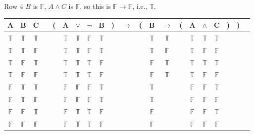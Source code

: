 \documentclass[
  ignorenonframetext,
]{beamer}
\renewcommand{\,}{\text{, }}
\def\True{\mathbb{T}}
\def\False{\mathbb{F}}
\begin{document}
\begin{frame}{Row 4}
\protect\hypertarget{row-4}{}
\(B\) is \(\False\), \(A \wedge C\) is \(\False\), so this is
\(\False \rightarrow \False\), i.e., \(\True\).

\begin{center}

\begin{tabular}{@{ }c@{ }@{ }c@{ }@{ }c | c@{ }@{}c@{}@{ }c@{ }@{ }c@{ }@{ }c@{ }@{ }c@{ }@{}c@{}@{ }c@{ }@{}c@{}@{ }c@{ }@{ }c@{ }@{}c@{}@{ }c@{ }@{ }c@{ }@{ }c@{ }@{}c@{}@{}c@{}@{ }c}
A & B & C &  & ( & A & $\vee$ & $\neg$ & B & ) & $\rightarrow$ & ( & B & $\rightarrow$ & ( & A & $\wedge$ & C & ) & ) & \\
\hline 
 $\True$ & $\True$ & $\True$ &  &  & $\True$ & $\True$ & $\False$ & $\True$ &  &&  & $\True$ & $\True$ &  & $\True$ & $\True$ & $\True$ &  &  & \\
 $\True$ & $\True$ & $\False$ &  &  & $\True$ & $\True$ & $\False$ & $\True$ &  &&  & $\True$ & $\False$ &  & $\True$ & $\False$ & $\False$ &  &  & \\
 $\True$ & $\False$ & $\True$ &  &  & $\True$ & $\True$ & $\True$ & $\False$ &  &&  & $\False$ & $\True$ &  & $\True$ & $\True$ & $\True$ &  &  & \\
 $\True$ & $\False$ & $\False$ &  &  & $\True$ & $\True$ & $\True$ & $\False$ &  &&  & $\False$ & $\True$ &  & $\True$ & $\False$ & $\False$ &  &  & \\
 $\False$ & $\True$ & $\True$ &  &  & $\False$ & $\False$ & $\False$ & $\True$ &  &&  & $\True$ &&  & $\False$ & $\False$ & $\True$ &  &  & \\
 $\False$ & $\True$ & $\False$ &  &  & $\False$ & $\False$ & $\False$ & $\True$ &  &&  & $\True$ &&  & $\False$ & $\False$ & $\False$ &  &  & \\
 $\False$ & $\False$ & $\True$ &  &  & $\False$ & $\True$ & $\True$ & $\False$ &  &&  & $\False$ &&  & $\False$ & $\False$ & $\True$ &  &  & \\
 $\False$ & $\False$ & $\False$ &  &  & $\False$ & $\True$ & $\True$ & $\False$ &  &&  & $\False$ &&  & $\False$ & $\False$ & $\False$ &  &  & \\
\end{tabular}

\end{center}
\end{frame}
\end{document}

